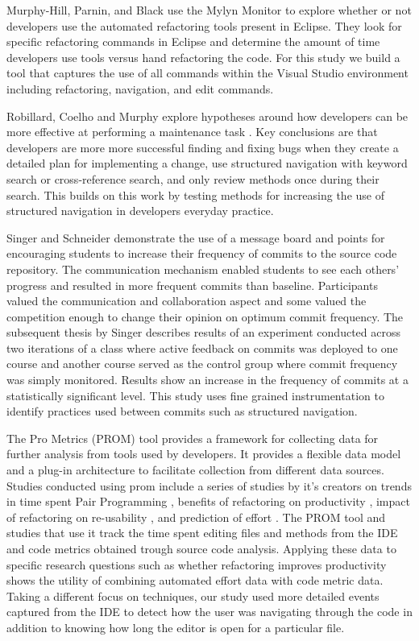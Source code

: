 \documentclass{sig-alternate}
\begin{document}
Murphy-Hill, Parnin, and Black \cite{V:MurphyHill2012How} use the Mylyn Monitor to explore whether or not developers use the automated refactoring tools present in Eclipse.  They look for specific refactoring commands in Eclipse and determine the amount of time developers use tools versus hand refactoring the code.  For this study we build a tool that captures the use of all commands within the Visual Studio environment including refactoring, navigation, and edit commands.

Robillard, Coelho and Murphy explore hypotheses around how developers can be more effective at performing a maintenance task \cite{wbsnipes:Robillard2004How}.  Key conclusions are that developers are more more successful finding and fixing bugs when they create a detailed plan for implementing a change, use structured navigation with keyword search or cross-reference search, and only review methods once during their search.  This builds on this work by testing methods for increasing the use of structured navigation in developers everyday practice.

Singer and Schneider demonstrate the use of a message board and points for encouraging students to increase their frequency of commits to the source code repository.\cite{Singer2012It}  The communication mechanism enabled students to see each others' progress and resulted in more frequent commits than baseline.  Participants valued the communication and collaboration aspect and some valued the competition enough to change their opinion on optimum commit frequency.  The subsequent thesis by Singer \cite{Singer2013a} describes results of an experiment conducted across two iterations of a class where active feedback on commits was deployed to one course and another course served as the control group where commit frequency was simply monitored.  Results show an increase in the frequency of commits at a statistically significant level.  This study uses fine grained instrumentation to identify practices used between commits such as structured navigation.

The Pro Metrics (PROM) tool provides a framework for collecting data for further analysis from tools used by developers.\cite{Coman2009Casestudy}  It provides a flexible data model and a plug-in architecture to facilitate collection from different data sources.  Studies conducted using prom include a series of studies by it's creators on trends in time spent Pair Programming \cite{Coman2008Investigating}, benefits of refactoring on productivity \cite{Moser2008Case}, impact of refactoring on re-usability \cite{Moser2006Does}, and prediction of effort \cite{Abrahamsson2007Effort}.  The PROM tool and studies that use it track the time spent editing files and methods from the IDE and code metrics obtained trough source code analysis.  Applying these data to specific research questions such as whether refactoring improves productivity \cite{Moser2008Case} shows the utility of combining automated effort data with code metric data.  Taking a different focus on techniques, our study used more detailed events captured from the IDE  to detect how the user was navigating through the code in addition to knowing how long the editor is open for a particular file.
\end{document}
